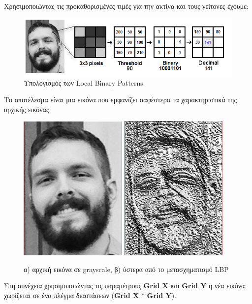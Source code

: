 Χρησιμοποιώντας τις προκαθορισμένες τιμές για την ακτίνα και τους γείτονες έχουμε:


\begin{figure}[htbp]
  \begin{center}
    \includegraphics[width=1.0\maxwidth]{../figures/lbph1.png}
    \caption{Υπολογισμός των Local Binary Patterns}
    \label{fig:lbph1}
  \end{center}
\end{figure}

Το αποτέλεσμα είναι μια εικόνα που εμφανίζει σαφέστερα τα χαρακτηριστικά της αρχικής
εικόνας.


\begin{figure}[htp]
    \centering
    \includegraphics[width=.20\textwidth]{../figures/lbph4.png}\hspace{50pt}%
    \includegraphics[width=.20\textwidth]{../figures/lbph3.png}\hfill

    \caption{α) αρχική εικόνα σε grayscale, β) ύστερα από το μετασχηματισμό LBP }
    \label{fig:lbph2}

\end{figure}

Στη συνέχεια χρησιμοποιώντας τις παραμέτρους \textbf{Grid X} και \textbf{Grid Y}
η νέα εικόνα χωρίζεται σε ένα πλέγμα διαστάσεων (\textbf{Grid X} $*$ \textbf{Grid Y}).

